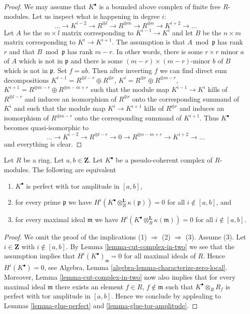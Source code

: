 \begin{proof}
We may assume that $K^\bullet$ is a bounded above
complex of finite free $R$-modules. Let us inspect what is happening
in degree $i$:
$$
\ldots \to K^{i - 2} \to R^{\oplus l}
\to R^{\oplus m} \to R^{\oplus n} \to K^{i + 2} \to \ldots
$$
Let $A$ be the $m \times l$ matrix corresponding to $K^{i - 1} \to K^i$
and let $B$ be the $n \times m$ matrix corresponding to $K^i \to K^{i + 1}$.
The assumption is that $A \bmod \mathfrak p$ has rank $r$ and that
$B \bmod \mathfrak p$ has rank $m - r$. In other words, there is some
$r \times r$ minor $a$ of $A$ which is not in $\mathfrak p$ and there is
some $(m - r) \times (m - r)$-minor $b$ of $B$ which is not in $\mathfrak p$.
Set $f = ab$. Then after inverting $f$ we can find direct sum decompositions
$K^{i - 1} = R^{\oplus l - r} \oplus R^{\oplus r}$,
$K^i = R^{\oplus r} \oplus R^{\oplus m - r}$,
$K^{i + 1} = R^{\oplus m - r} \oplus R^{\oplus n - m + r}$
such that the module map $K^{i - 1} \to K^i$ kills of
$R^{\oplus l - r}$ and induces an isomorphism of $R^{\oplus r}$ onto the
corresponding summand of $K^i$ and such that the module map $K^i \to K^{i + 1}$
kills of $R^{\oplus r}$ and induces an isomorphism of $R^{\oplus m - r}$
onto the corresponding summand of $K^{i + 1}$. Thus $K^\bullet$ becomes
quasi-isomorphic to
$$
\ldots \to K^{i - 2} \to R^{\oplus l - r}
\to 0 \to R^{\oplus n - m + r} \to K^{i + 2} \to \ldots
$$
and everything is clear.
\end{proof}

\begin{lemma}
\label{lemma-check-perfect-pointwise}
Let $R$ be a ring. Let $a, b \in \mathbf{Z}$.
Let $K^\bullet$ be a pseudo-coherent complex of $R$-modules.
The following are equivalent
\begin{enumerate}
\item $K^\bullet$ is perfect with tor amplitude in $[a, b]$,
\item for every prime $\mathfrak p$ we have
$H^i(K^\bullet \otimes_R^{\mathbf{L}} \kappa(\mathfrak p)) = 0$ for all
$i \not \in [a, b]$, and
\item for every maximal ideal $\mathfrak m$ we have
$H^i(K^\bullet \otimes_R^{\mathbf{L}} \kappa(\mathfrak m)) = 0$ for all
$i \not \in [a, b]$.
\end{enumerate}
\end{lemma}

\begin{proof}
We omit the proof of the implications (1) $\Rightarrow$ (2) $\Rightarrow$ (3).
Assume (3). Let $i \in \mathbf{Z}$ with $i \not \in [a, b]$. By
Lemma \ref{lemma-cut-complex-in-two}
we see that the assumption implies that $H^i(K^\bullet)_{\mathfrak m} = 0$
for all maximal ideals of $R$. Hence $H^i(K^\bullet) = 0$, see
Algebra, Lemma \ref{algebra-lemma-characterize-zero-local}.
Moreover,
Lemma \ref{lemma-cut-complex-in-two}
now also implies that for every maximal ideal
$\mathfrak m$ there exists an element $f \in R$, $f \not \in \mathfrak m$
such that $K^\bullet \otimes_R R_f$ is perfect with tor amplitude in
$[a, b]$. Hence we conclude by applealing to
Lemmas \ref{lemma-glue-perfect} and \ref{lemma-glue-tor-amplitude}.
\end{proof}


